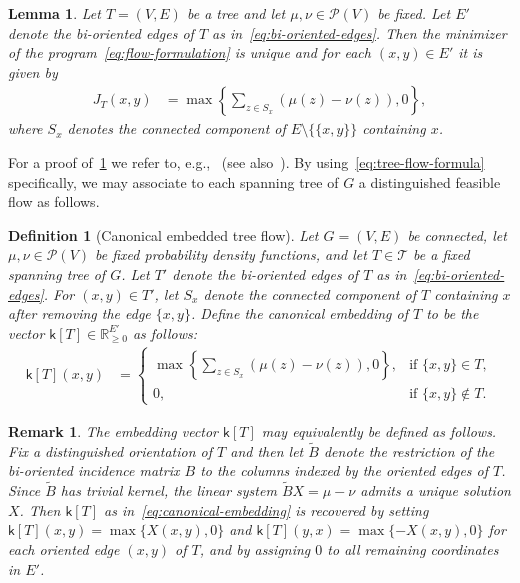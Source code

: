 \documentclass[10pt,a4paper]{amsart}
\newcommand{\prob}{{\mathscr{P}}}
\newcommand{\setoftrees}{{\mathcal{T}}}
\newcommand{\embedding}{{\mathsf{k}}}
\newtheorem{remark}[theorem]{Remark}
\newtheorem{definition}[theorem]{Definition}
\newtheorem{lemma}[theorem]{Lemma}
\begin{document}
    \begin{lemma}\label{lem:transport-on-trees-formula}
        Let $T=(V,E)$ be a tree and let $\mu,\nu\in\prob(V)$ be fixed. Let $E'$ denote the bi-oriented edges of $T$ as in~\cref{eq:bi-oriented-edges}. Then the minimizer of the program~\cref{eq:flow-formulation} is unique and for each $(x,y)\in E'$ it is given by
            \begin{align}\label{eq:tree-flow-formula}
                J_T(x,y) &= \max\left\{\sum_{z\in S_x}(\mu(z)-\nu(z)),0\right\},
            \end{align}
        where $S_x$ denotes the connected component of $E\setminus\{\{x,y\}\}$ containing $x$.
    \end{lemma}

    For a proof of~\cref{lem:transport-on-trees-formula} we refer to, e.g.,~\cite{bapat1997moore} (see also~\cite{robertson2024all}). By using~\cref{eq:tree-flow-formula} specifically, we may associate to each spanning tree of $G$ a distinguished feasible flow as follows.

    \begin{definition}[Canonical embedded tree flow]\label{def:canonical-embedding}
        Let $G=(V,E)$ be connected, let $\mu,\nu\in\prob(V)$ be fixed probability density functions, and let $T\in\setoftrees$ be a fixed spanning tree of $G$. Let $T'$ denote the bi-oriented edges of $T$ as in~\cref{eq:bi-oriented-edges}. For $(x,y)\in T'$, let $S_x$ denote the connected component of $T$ containing $x$ after removing the edge $\{x,y\}$. Define the \emph{canonical embedding} of $T$ to be the vector $\embedding[T]\in \mathbb{R}_{\ge 0}^{E'}$ as follows:
            \begin{align}\label{eq:canonical-embedding}
                \embedding[T](x,y) &= \begin{cases}
                    \max\left\{\sum_{z\in S_x} (\mu(z)-\nu(z)), 0\right\}, & \text{if } \{x,y\}\in T,\\
                    0, & \text{if } \{x,y\}\notin T.
                \end{cases}
            \end{align}
    \end{definition}

    \begin{remark}\label{rmk:canonical-embedding}
        The embedding vector $\embedding[T]$ may equivalently be defined as follows. Fix a distinguished orientation of $T$ and then let $\widetilde{B}$ denote the restriction of the bi-oriented incidence matrix $B$ to the columns indexed by the oriented edges of $T$. Since $\widetilde{B}$ has trivial kernel, the linear system $\widetilde{B} X = \mu-\nu$ admits a unique solution $X$. 
        Then $\embedding[T]$ as in~\cref{eq:canonical-embedding} is recovered by setting $\embedding[T](x,y)=\max\{X(x,y),0\}$ and $\embedding[T](y,x)=\max\{-X(x,y),0\}$ for each oriented edge $(x,y)$ of $T$, and by assigning $0$ to all remaining coordinates in $E'$. 
    \end{remark}
    
\end{document}
